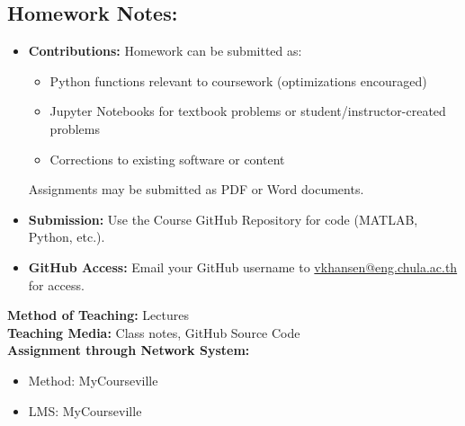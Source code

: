 \documentclass[12pt]{article}
\begin{document}
\begin{enumerate}
\subsection*{Homework Notes:}
\begin{itemize}
    \item \textbf{Contributions:} Homework can be submitted as:
        \begin{itemize}
            \item Python functions relevant to coursework (optimizations encouraged)
            \item Jupyter Notebooks for textbook problems or student/instructor-created problems
            \item Corrections to existing software or content
        \end{itemize}
        Assignments may be submitted as PDF or Word documents.
    \item \textbf{Submission:} Use the Course GitHub Repository for code (MATLAB, Python, etc.).
    \item \textbf{GitHub Access:} Email your GitHub username to \href{mailto:vkhansen@eng.chula.ac.th}{vkhansen@eng.chula.ac.th} for access.
\end{itemize}

\textbf{Method of Teaching:} Lectures \\
\textbf{Teaching Media:} Class notes, GitHub Source Code \\
\textbf{Assignment through Network System:}
\begin{itemize}
    \item Method: MyCourseville
    \item LMS: MyCourseville
\end{itemize}


\end{enumerate}
\end{document}
